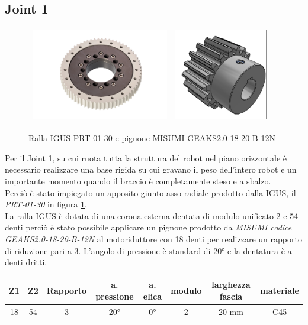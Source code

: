 \documentclass[%
corpo=11pt,
twoside,
 stile=classica,
oldstyle,
greek,%
]{toptesi}
\begin{document}
		\subsection{Joint 1}
		\begin{figure}
			\centering
			\begin{tabular}{ll}
				\includegraphics[height=4cm,keepaspectratio]{pictures/ralla.jpg}
				&
				\includegraphics[height=4cm,keepaspectratio]{pictures/pignone.png}
			\end{tabular}
			\caption{Ralla IGUS PRT 01-30 e pignone MISUMI GEAKS2.0-18-20-B-12N}
			\label{fig:RALLA}
		\end{figure}
		Per il Joint 1, su cui ruota tutta la struttura del robot nel piano orizzontale è necessario realizzare una base rigida su cui gravano il peso dell'intero robot e un importante momento quando il braccio è completamente steso e a sbalzo.\\
		 Perciò è stato impiegato un apposito giunto asso-radiale prodotto dalla IGUS, il \textit{PRT-01-30} in figura \ref{fig:RALLA}. \\
		La ralla IGUS è dotata di una corona esterna dentata di modulo unificato 2 e 54 denti perciò è stato possibile applicare un pignone prodotto da \textit{MISUMI codice GEAKS2.0-18-20-B-12N} al motoriduttore con 18 denti per realizzare un rapporto di riduzione pari a 3. L'angolo di pressione è standard di 20° e la dentatura è a denti dritti. 
		
		\begin{tabular}{|c|c|c|c|c|c|c|c|}
			
			\hline
			Z1 & Z2 & Rapporto & a. pressione & a. elica & modulo & larghezza fascia & materiale \\
			\hline
			18 & 54 & 3 & 20° & 0°  & 2 & 20 mm & C45  \\
			\hline
			
		\end{tabular}
		
\end{document}
